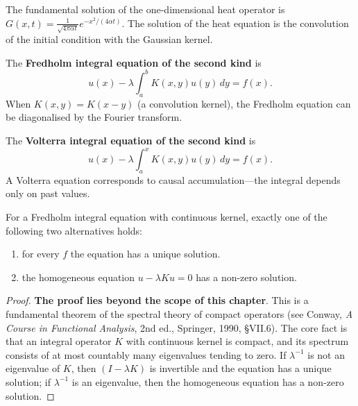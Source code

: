 \begin{example}\label{ex:heat_green}
The fundamental solution of the one-dimensional heat operator is $G(x, t) = \frac{1}{\sqrt{4\pi\alpha t}} e^{-x^2/(4\alpha t)}$. The solution of the heat equation is the convolution of the initial condition with the Gaussian kernel.
\end{example}

\begin{definition}\label{def:fredholm_integral_equation}
The \textbf{Fredholm integral equation of the second kind} is
\[
u(x) - \lambda \int_a^b K(x, y) u(y) \, dy = f(x).
\]
When $K(x, y) = K(x-y)$ (a convolution kernel), the Fredholm equation can be diagonalised by the Fourier transform.
\end{definition}

\begin{definition}\label{def:volterra_integral_equation}
The \textbf{Volterra integral equation of the second kind} is
\[
u(x) - \lambda \int_a^x K(x, y) u(y) \, dy = f(x).
\]
A Volterra equation corresponds to causal accumulation---the integral depends only on past values.
\end{definition}

\begin{theorem}\label{thm:fredholm_alternative}
For a Fredholm integral equation with continuous kernel, exactly one of the following two alternatives holds:
\begin{enumerate}[label=(\roman*)]
    \item for every $f$ the equation has a unique solution.
    \item the homogeneous equation $u - \lambda Ku = 0$ has a non-zero solution.
\end{enumerate}
\end{theorem}

\begin{proof}
\textbf{The proof lies beyond the scope of this chapter}. This is a fundamental theorem of the spectral theory of compact operators (see Conway, \textit{A Course in Functional Analysis}, 2nd ed., Springer, 1990, \S{}VII.6). The core fact is that an integral operator $K$ with continuous kernel is compact, and its spectrum consists of at most countably many eigenvalues tending to zero. If $\lambda^{-1}$ is not an eigenvalue of $K$, then $(I - \lambda K)$ is invertible and the equation has a unique solution; if $\lambda^{-1}$ is an eigenvalue, then the homogeneous equation has a non-zero solution.
\end{proof}

